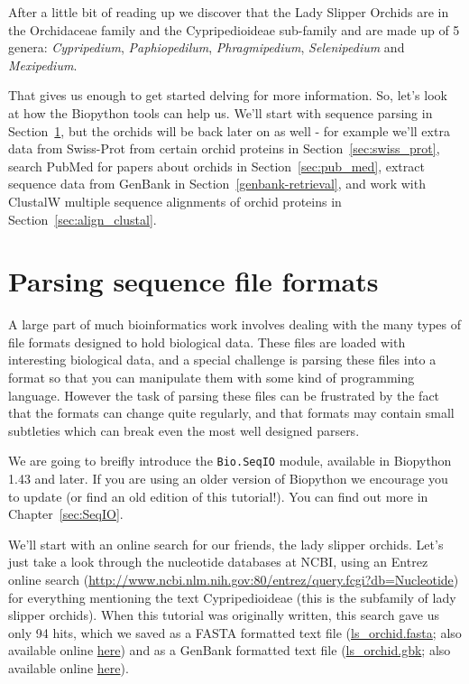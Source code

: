 \documentclass{report}
\begin{document}

After a little bit of reading up we discover that the Lady Slipper Orchids are in the Orchidaceae family and the Cypripedioideae sub-family and are made up of 5 genera:  \emph{Cypripedium}, \emph{Paphiopedilum}, \emph{Phragmipedium}, \emph{Selenipedium} and \emph{Mexipedium}.

That gives us enough to get started delving for more information. So, let's look at how the Biopython tools can help us.  We'll start with sequence parsing in Section~\ref{sec:sequence-parsing}, but the orchids will be back later on as well - for example we'll extra data from Swiss-Prot from certain orchid proteins in Section~\ref{sec:swiss_prot}, search PubMed for papers about orchids in Section~\ref{sec:pub_med}, extract sequence data from GenBank in Section~\ref{genbank-retrieval}, and work with ClustalW multiple sequence alignments of orchid proteins in Section~\ref{sec:align_clustal}.

\section{Parsing sequence file formats}
\label{sec:sequence-parsing}

A large part of much bioinformatics work involves dealing with the many types of file formats designed to hold biological data. These files are loaded with interesting biological data, and a special challenge is parsing these files into a format so that you can manipulate them with some kind of programming language. However the task of parsing these files can be frustrated by the fact that the formats can change quite regularly, and that formats may contain small subtleties which can break even the most well designed parsers. 

We are going to breifly introduce the \verb|Bio.SeqIO| module, available in Biopython 1.43 and later.  If you are using an older version of Biopython we encourage you to update (or find an old edition of this tutorial!). You can find out more in Chapter~\ref{sec:SeqIO}.

We'll start with an online search for our friends, the lady slipper orchids. Let's just take a look through the nucleotide databases at NCBI, using an Entrez online search (\url{http://www.ncbi.nlm.nih.gov:80/entrez/query.fcgi?db=Nucleotide}) for everything mentioning the text Cypripedioideae (this is the subfamily of lady slipper orchids). When this tutorial was originally written, this search gave us only 94 hits, which we saved as a FASTA formatted text file (\href{examples/ls_orchid.fasta}{ls\_orchid.fasta}; also available online \href{http://biopython.org/DIST/docs/tutorial/examples/ls_orchid.fasta}{here}) and as a GenBank formatted text file (\href{examples/ls_orchid.gbk}{ls\_orchid.gbk}; also available online \href{http://biopython.org/DIST/docs/tutorial/examples/ls_orchid.gbk}{here}).
\end{document}
